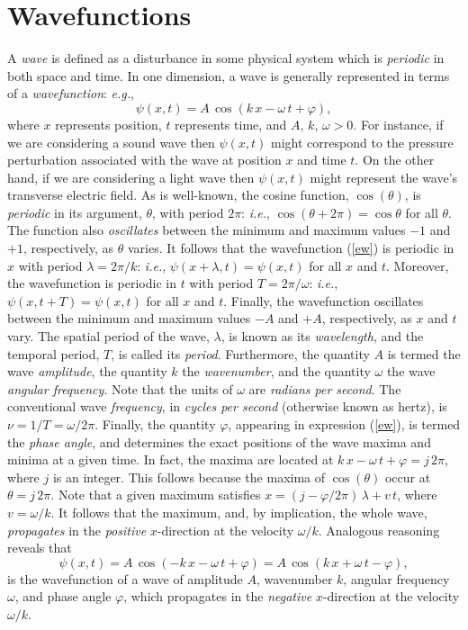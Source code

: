 \section{Wavefunctions}
A {\em wave}\/ is defined as a disturbance in some physical system which is {\em periodic}\/ in both space and time. 
In one dimension, a wave is generally represented in terms of a {\em wavefunction}: {\em e.g.}, 
\begin{equation}\label{ew}
\psi(x,t) = A\,\cos(k\,x-\omega\,t+\varphi),
\end{equation}
where  $x$ represents position,  $t$ represents time, and $A$, $k$, $\omega >0$. 
For instance, if we are considering a sound wave then $\psi(x,t)$ might correspond to the pressure perturbation
associated with the wave at position $x$ and time $t$. On the other hand, if we are considering a light wave then $\psi(x,t)$
might represent the wave's transverse electric field. As is well-known, the cosine function, $\cos(\theta)$, 
is {\em periodic}\/ in its argument, $\theta$, with period $2\pi$: {\em i.e.}, $\cos(\theta+2\pi)=\cos\theta$ for all $\theta$. 
The function also {\em oscillates}\/ between the minimum and maximum values $-1$ and $+1$, respectively, as
$\theta$ varies. It follows that the wavefunction (\ref{ew}) is periodic in $x$ with period $\lambda=2\pi/k$:
{\em i.e.}, $\psi(x+\lambda,t)=\psi(x,t)$ for all $x$ and $t$. Moreover, the wavefunction is periodic
in $t$ with period $T=2\pi/\omega$: {\em i.e.}, $\psi(x,t+T)=\psi(x,t)$ for all $x$ and $t$.
Finally, the wavefunction oscillates between the minimum and
maximum values $-A$ and $+A$, respectively, as   $x$ and $t$ vary. The spatial period of the wave, $\lambda$, is
known as its {\em wavelength}, and the temporal period, $T$, is called its {\em period}.  Furthermore, the quantity
$A$ is  termed the wave {\em amplitude}, the quantity $k$ the {\em wavenumber}, and the
quantity $\omega$ the wave {\em angular frequency}. Note that the units of $\omega$ are {\em radians per second}. 
The conventional wave {\em frequency}, in {\em cycles per second}\/ (otherwise known as hertz), is $\nu=1/T=\omega/2\pi$. Finally, the quantity $\varphi$, appearing in expression (\ref{ew}), is termed the
{\em phase angle}, and  determines the exact positions of the wave maxima and minima at a given time. In fact, the maxima are located at $k\,x-\omega\,t+\varphi = j\,2\pi$, where $j$ is an integer. This follows
because the maxima of $\cos(\theta)$ occur at $\theta=j\,2\pi$. Note that a given maximum
satisfies $x=(j-\varphi/2\pi)\,\lambda+ v\,t$, where $v=\omega/k$. It follows that the maximum, and, by implication, the whole wave, {\em propagates}\/ in
the {\em positive}\/ $x$-direction at the velocity $\omega/k$. Analogous reasoning reveals that
\begin{equation}
\psi(x,t) = A\,\cos(-k\,x-\omega\,t+\varphi)=A\,\cos(k\,x+\omega\,t-\varphi),
\end{equation}
is the wavefunction of a wave of amplitude $A$, wavenumber $k$, angular frequency $\omega$, and phase
angle $\varphi$, which propagates in the {\em negative}\/ $x$-direction at the velocity $\omega/k$. 


